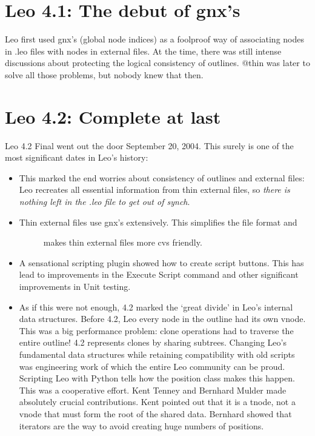 \documentclass[a4paper,10pt,english]{sphinxmanual}
\begin{document}
\section{Leo 4.1: The debut of gnx's}
\label{history:leo-4-1-the-debut-of-gnx-s}
Leo first used gnx's (global node indices) as a foolproof way of associating
nodes in .leo files with nodes in external files. At the time, there was
still intense discussions about protecting the logical consistency of
outlines. @thin was later to solve all those problems, but nobody knew
that then.


\section{Leo 4.2: Complete at last}
\label{history:leo-4-2-complete-at-last}
Leo 4.2 Final went out the door September 20, 2004.
This surely is one of the most significant dates in Leo's history:
\begin{itemize}
\item {} 
This marked the end worries about consistency of outlines and external files:
Leo recreates all essential information from thin external files,
so \emph{there is nothing left in the .leo file to get out of synch}.

\item {} \begin{description}
\item[{Thin external files use gnx's extensively. This simplifies the file format and}] \leavevmode
makes thin external files more cvs friendly.

\end{description}

\item {} 
A sensational scripting plugin showed how to create script buttons.
This has lead to improvements in the Execute Script command and
other significant improvements in Unit testing.

\item {} 
As if this were not enough, 4.2 marked the `great divide' in Leo's internal
data structures. Before 4.2, Leo every node in the outline had its own
vnode. This was a big performance problem: clone operations had to
traverse the entire outline! 4.2 represents clones by sharing subtrees.
Changing Leo's fundamental data structures while retaining compatibility
with old scripts was engineering work of which the entire Leo community can
be proud. Scripting Leo with Python tells how the position
class makes this happen.
This was a cooperative effort. Kent Tenney and Bernhard Mulder made
absolutely crucial contributions. Kent pointed out that it is a tnode,
not a vnode that must form the root of the shared data. Bernhard showed
that iterators are the way to avoid creating huge numbers of positions.

\end{itemize}
\end{document}
